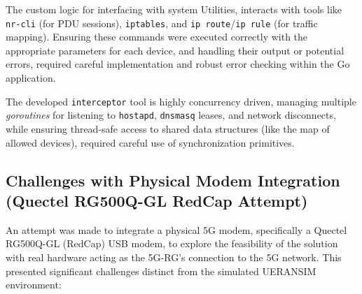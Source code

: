 The custom logic for interfacing with system Utilities, interacts with tools like \texttt{nr-cli} (for \ac{PDU} sessions), \texttt{iptables}, and \texttt{ip route}/\texttt{ip rule} (for traffic mapping). Ensuring these commands were executed correctly with the appropriate parameters for each device, and handling their output or potential errors, required careful implementation and robust error checking within the Go application.

The developed \texttt{interceptor} tool is highly concurrency driven, managing multiple \textit{goroutines} for listening to \texttt{hostapd}, \texttt{dnsmasq} leases, and network disconnects, while ensuring thread-safe access to shared data structures (like the map of allowed devices), required careful use of synchronization primitives.

\subsection{Challenges with Physical Modem Integration (Quectel RG500Q-GL RedCap Attempt)}

An attempt was made to integrate a physical \ac{5G} modem, specifically a Quectel RG500Q-GL (RedCap) \ac{USB} modem, to explore the feasibility of the solution with real hardware acting as the \ac{5G-RG}'s connection to the \ac{5G} network. This presented significant challenges distinct from the simulated UERANSIM environment:

